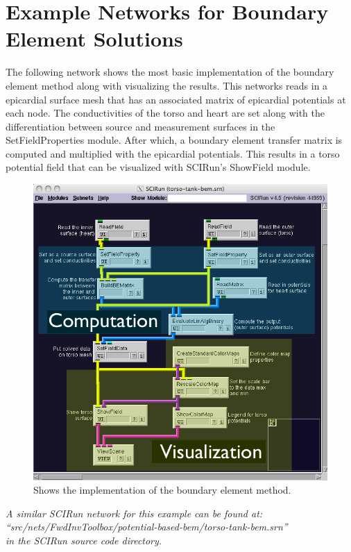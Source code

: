 \section{Example Networks for Boundary Element Solutions}
The following network shows the most basic implementation of the boundary element method
along with visualizing the results.  This networks reads in a epicardial surface mesh that has an associated matrix of epicardial potentials at each node.  The conductivities of the torso and heart
are set along with the differentiation between source and measurement surfaces in the SetFieldProperties module.  After which, a boundary element transfer matrix is computed and multiplied with the epicardial potentials.  This results in a torso potential field that can be visualized with SCIRun's ShowField module. 

\begin{figure}[H]
\begin{center}
\includegraphics[width=\textwidth]{ECGToolkitGuide_figures/BEMnetwork.png}
\caption{Shows the implementation of the boundary element method.}
\label{BEMnet}
\end{center}
\end{figure}

\vspace{5pt}\textit{A similar SCIRun network for this example can be found at:\\``src/nets/FwdInvToolbox/potential-based-bem/torso-tank-bem.srn''\\in the SCIRun source code directory.}\vspace{5pt}

